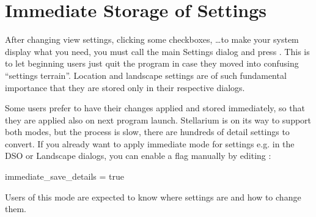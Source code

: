 \section{Immediate Storage of Settings}
\label{sec:CommandLineOptions:Special:ImmediateStorage}

After changing view settings, clicking some checkboxes, \ldots to make your system display what you need, 
you must call the main Settings dialog and press . 
This is to let beginning users just quit the program in case they moved into confusing ``settings terrain''. 
Location and landscape settings are of such fundamental importance that they are stored only in their respective dialogs.

Some users prefer to have their changes applied and stored immediately, so that they are applied also on next program launch. 
Stellarium is on its way to support both modes, but the process is slow, there are hundreds of detail settings to convert. 
If you already want to apply immediate mode for settings  e.g. in the DSO or Landscape dialogs, 
you can enable a flag manually by editing :

\begin{configfile}
[gui]
immediate_save_details = true
\end{configfile}
Users of this mode are expected to know where settings are and how to change them. 


